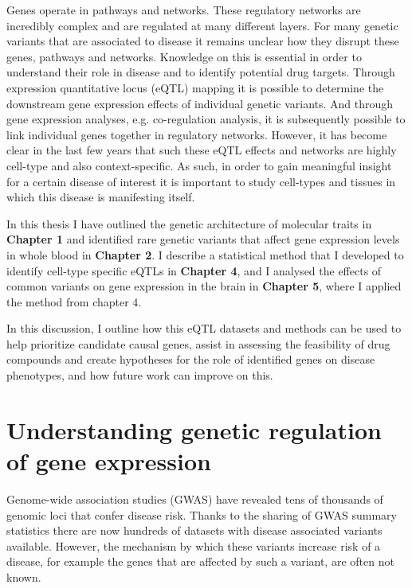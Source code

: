 Genes operate in pathways and networks. These regulatory networks are incredibly complex and are regulated at many different layers. For many genetic variants that are associated to disease it remains unclear how they disrupt these genes, pathways and networks. Knowledge on this is essential in order to understand their role in disease and to identify potential drug targets. Through expression quantitative locus (eQTL) mapping it is possible to determine the downstream gene expression effects of individual genetic variants. And through gene expression analyses, e.g. co-regulation analysis, it is subsequently possible to link individual genes together in regulatory networks. However, it has become clear in the last few years that such these eQTL effects and networks are highly cell-type and also context-specific. As such, in order to gain meaningful insight for a certain disease of interest it is important to study cell-types and tissues in which this disease is manifesting itself.

In this thesis I have outlined the genetic architecture of molecular traits in \textbf{Chapter 1}\cite{claringbouldGeneticArchitectureMolecular2017} and identified rare genetic variants that affect gene expression levels in whole blood in \textbf{Chapter 2}\cite{kleinImbalancedExpressionPredicted2020}. I describe a statistical method that I developed to identify cell-type specific eQTLs in \textbf{Chapter 4}\cite{raulaguirre-gamboaDeconvolutionBulkBlood2020}, and I analysed the effects of common variants on gene expression in the brain in \textbf{Chapter 5}, where I applied the method from chapter 4.

In this discussion, I outline how this eQTL datasets and methods can be used to help prioritize candidate causal genes, assist in assessing the feasibility of drug compounds and create hypotheses for the role of identified genes on disease phenotypes, and how future work can improve on this.

\section{Understanding genetic regulation of gene expression}
Genome-wide association studies (GWAS) have revealed tens of thousands of genomic loci that confer disease risk. Thanks to the sharing of GWAS summary statistics there are now hundreds of datasets with disease associated variants available\cite{visscher10YearsGWAS2017}. However, the mechanism by which these variants increase risk of a disease, for example the genes that are affected by such a variant, are often not known.

